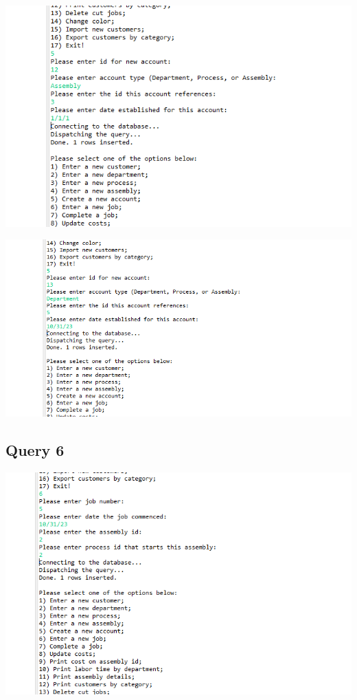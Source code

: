 \documentclass[11pt]{article}
\begin{document}
\includegraphics[width = \textwidth]{acct4.png}

\includegraphics[width = \textwidth]{acct5.png}
\subsection{Query 6}

\includegraphics[width = \textwidth]{job1.png}
\end{document}
